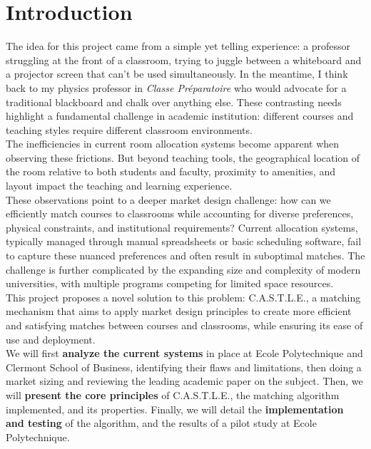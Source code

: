 \documentclass[a4paper, oneside]{article}
\theoremstyle{plain}
\newcommand{\castle}{C{\small.}A{\small.}S{\small.}T{\small.}L{\small.}E{\small.}}
\begin{document}
\tableofcontents
\pagebreak

\section*{Introduction}

The idea for this project came from a simple yet telling experience: a professor struggling at the front of a classroom, trying to juggle between a whiteboard
and a projector screen that can't be used simultaneously. In the meantime, I think back to my physics professor in \textit{Classe Préparatoire} who would advocate
for a traditional blackboard and chalk over anything else. These contrasting needs highlight a fundamental challenge in academic institution: different 
courses and teaching styles require different classroom environments.\\

The inefficiencies in current room allocation systems become apparent when observing these frictions. But beyond teaching tools, the geographical location of the room
relative to both students and faculty, proximity to amenities, and layout impact the teaching and learning experience.\\

These observations point to a deeper market design challenge: how can we efficiently match courses to classrooms while accounting for diverse preferences, 
physical constraints, and institutional requirements? Current allocation systems, typically managed through manual spreadsheets or basic scheduling software, 
fail to capture these nuanced preferences and often result in suboptimal matches. The challenge is further complicated by the expanding size and complexity of 
modern universities, with multiple programs competing for limited space resources.\\

This project proposes a novel solution to this problem: \castle{}, a matching mechanism that aims to apply 
market design principles to create more efficient and satisfying matches between courses and classrooms, while ensuring its ease of use and deployment.\\

We will first \textbf{analyze the current systems} in place at Ecole Polytechnique and Clermont School of Business, identifying their flaws and limitations, then doing a market sizing and
reviewing the leading academic paper on the subject. Then, we will \textbf{present the core principles} of \castle{}, the matching algorithm implemented, and its properties. 
Finally, we will detail the \textbf{implementation and testing} of the algorithm, and the results of a pilot study at Ecole Polytechnique.\\
\pagebreak
\end{document}
